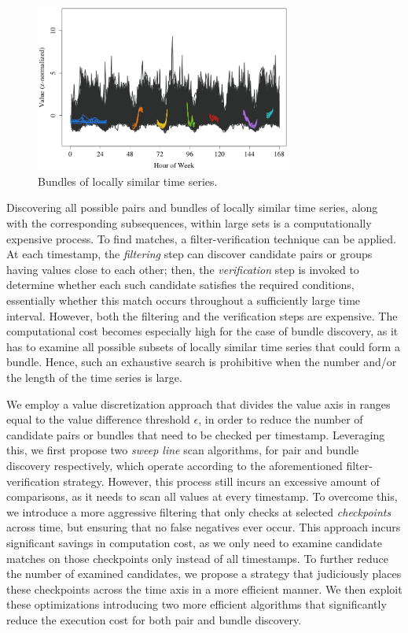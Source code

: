 \begin{figure}[tb]
    \centering
    \includegraphics[width=0.75\textwidth]{figures/bundles_water.png}
    \caption{Bundles of locally similar time series.}
    \label{fig:bundles_water}
\end{figure}

Discovering all possible pairs and bundles of locally similar time series, along with the corresponding subsequences, within large sets is a computationally expensive process. To find matches, a filter-verification technique can be applied. At each timestamp, the {\em filtering} step can discover candidate pairs or groups having values close to each other; then, the {\em verification} step is invoked to determine whether each such candidate satisfies the required conditions, essentially whether this match occurs throughout a sufficiently large time interval. However, both the filtering and the verification steps are expensive. The computational cost becomes especially high for the case of bundle discovery, as it has to examine all possible subsets of locally similar time series that could form a bundle. Hence, such an exhaustive search is prohibitive when the number and/or the length of the time series is large.

We employ a value discretization approach that divides the value axis in ranges equal to the value difference threshold $\epsilon$, in order to reduce the number of candidate pairs or bundles that need to be checked per timestamp. Leveraging this, we first propose two \textit{sweep line} scan algorithms, for pair and bundle discovery respectively, which operate according to the aforementioned filter-verification strategy. However, this process still incurs an excessive amount of comparisons, as it needs to scan all values at every timestamp. To overcome this, we introduce a more aggressive filtering  that only checks at selected \textit{checkpoints} across time, but ensuring that no false negatives ever occur. This approach incurs significant savings in computation cost, as we only need to examine candidate matches on those checkpoints only instead of all timestamps. To further reduce the number of examined candidates, we propose a strategy that judiciously places these checkpoints across the time axis in a more efficient manner. We then exploit these optimizations introducing two more efficient algorithms that significantly reduce the execution cost for both pair and bundle discovery.

